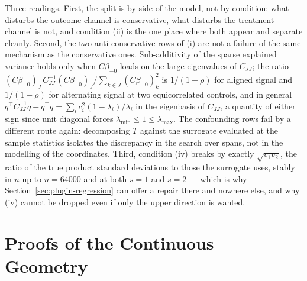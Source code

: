 {Three readings. First, the split is by side of the model, not by
condition: what disturbs the outcome channel is conservative, what
disturbs the treatment channel is not, and condition (ii) is the one
place where both appear and separate cleanly. Second, the two
anti-conservative rows of (i) are not a failure of the same mechanism as
the conservative ones. Sub-additivity of the sparse explained variance
holds only when $C\beta_{-0}$ loads on the large eigenvalues of
$C_{JJ}$; the ratio
$(C\beta_{-0})_J^\top C_{JJ}^{-1}(C\beta_{-0})_J
/ \sum_{k \in J}(C\beta_{-0})_k^2$ is $1/(1+\rho)$ for aligned signal
and $1/(1-\rho)$ for alternating signal at two equicorrelated controls,
and in general
$q^\top C_{JJ}^{-1} q - q^\top q
= \sum_i c_i^2 (1 - \lambda_i)/\lambda_i$ in the eigenbasis of
$C_{JJ}$, a quantity of either sign since unit diagonal forces
$\lambda_{\min} \le 1 \le \lambda_{\max}$. The confounding rows fail by
a different route again: decomposing $T$ against the surrogate evaluated
at the sample statistics isolates the discrepancy in the search over
spans, not in the modelling of the coordinates. Third, condition (iv)
breaks by exactly $\sqrt{v_1 v_2}$, the ratio of the true product
standard deviations to those the surrogate uses, stably in $n$ up to
$n = 64000$ and at both $s = 1$ and $s = 2$ --- which is why
Section~\ref{sec:plugin-regression} can offer a repair there and nowhere
else, and why (iv) cannot be dropped even if only the upper direction
is wanted.}


\section{Proofs of the Continuous Geometry}
\label{app:continuous}


